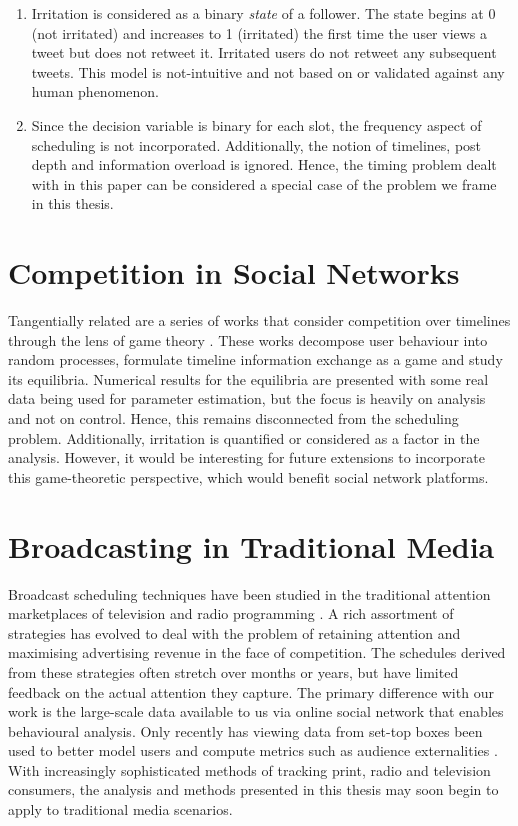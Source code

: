 \documentclass[onecolumn, 12 pt, doublespace, fullpage, letterpaper]{report}
\begin{document}
\begin{enumerate}
  \item Irritation is considered as a binary \textit{state} of a follower. The state begins at 0 (not irritated) and increases to 1 (irritated) the first time the user views a tweet but does not retweet it. Irritated users do not retweet any subsequent tweets. This model is not-intuitive and not based on or validated against any human phenomenon.
  \item Since the decision variable is binary for each slot, the frequency aspect of scheduling is not incorporated. Additionally, the notion of timelines, post depth and information overload is ignored. Hence, the timing problem dealt with in this paper can be considered a special case of the problem we frame in this thesis.
\end{enumerate}

\section{Competition in Social Networks}

Tangentially related are a series of works that consider competition over timelines through the lens of game theory \cite{altman2014strategic,reiffers2014game,altman2013competition}. These works decompose user behaviour into random processes, formulate timeline information exchange as a game and study its equilibria. Numerical results for the equilibria are presented with some real data being used for parameter estimation, but the focus is heavily on analysis and not on control. Hence, this remains disconnected from the scheduling problem. Additionally, irritation is quantified or considered as a factor in the analysis. However, it would be interesting for future extensions to incorporate this game-theoretic perspective, which would benefit social network platforms.

\section{Broadcasting in Traditional Media}

Broadcast scheduling techniques have been studied in the traditional attention marketplaces of television and radio programming \cite{eastman2012media,vane1994programming}. A rich assortment of strategies has evolved to deal with the problem of retaining attention and maximising advertising revenue in the face of competition. The schedules derived from these strategies often stretch over months or years, but have limited feedback on the actual attention they capture. The primary difference with our work is the large-scale data available to us via online social network that enables behavioural analysis. Only recently has viewing data from set-top boxes been used to better model users and compute metrics such as audience externalities \cite{wilbur2013audience}. With increasingly sophisticated methods of tracking print, radio and television consumers, the analysis and methods presented in this thesis may soon begin to apply to traditional media scenarios.
\end{document}
